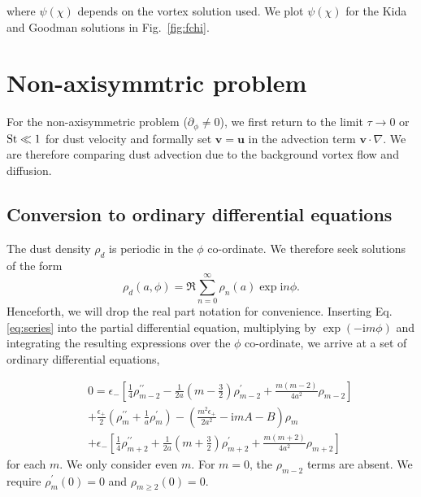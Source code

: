 \documentclass[useAMS,8pt,twocolumn]{article}
\newcommand{\Fig}[1]{Fig.~\ref{#1}}
\newcommand{\fig}[1]{\Fig{#1}}
\newcommand{\beq}{\begin{equation}}
\newcommand{\eeq}{\end{equation}}
\newcommand{\beqn}{\begin{eqnarray}}
\newcommand{\eeqn}{\end{eqnarray}}
\begin{document}
\noindent where $\psi(\chi)$ depends on the vortex solution used. We plot 
$\psi(\chi)$ for the Kida and Goodman solutions in \fig{fig:fchi}.





\section{Non-axisymmtric problem}
For the non-axisymmetric problem ($\partial_\phi\neq0$), we first
return to the limit $\tau\to0$ or $\rm{St}\ll 1$ for dust velocity and
formally set $\bm{v}=\bm{u}$ in the advection term 
$\bm{v}\cdot\nabla$. We are therefore comparing dust advection due to
the background vortex flow and diffusion. 

\subsection{Conversion to ordinary differential equations}
The dust density $\rho_d$ is periodic in the $\phi$ co-ordinate. We
therefore seek solutions of the form
\beq\label{eq:series}
\rho_d(a,\phi) = \Re\sum_{n=0}^\infty\rho_n(a)\exp{\mathrm{i}n\phi}. 
\eeq
Henceforth, we will drop the real part notation for convenience. Inserting
Eq. \ref{eq:series} into the partial differential equation,
multiplying by $\exp{(-\mathrm{i}m\phi)}$ and integrating the resulting
expressions over the $\phi$ co-ordinate, we arrive at a set of
ordinary differential equations,

\beqn\label{eq:ode1}
&&0=\epsilon_{-}\left[\frac{1}{4}\rho_{m-2}^{\prime\prime}
-\frac{1}{2a}\left(m-\frac{3}{2}\right)\rho_{m-2}^\prime +
\frac{m(m-2)}{4a^2}\rho_{m-2}\right] \nonumber\\
&&+\frac{\epsilon_+}{2}\left(\rho_m^{\prime\prime}+\frac{1}{a}\rho_m^\prime\right)
-\left(\frac{m^2\epsilon_+}{2a^2}-\mathrm{i}mA-B\right)\rho_m\nonumber\\
&&+\epsilon_{-}\left[\frac{1}{4}\rho_{m+2}^{\prime\prime}
+\frac{1}{2a}\left(m+\frac{3}{2}\right)\rho_{m+2}^\prime +
\frac{m(m+2)}{4a^2}\rho_{m+2} \right]
\eeqn
for each $m$. We only consider even $m$. For $m=0$, the $\rho_{m-2}$
terms are absent. We require $\rho_m^\prime(0)=0$ and $\rho_{m\geq2}(0)=0$. 
\end{document}
